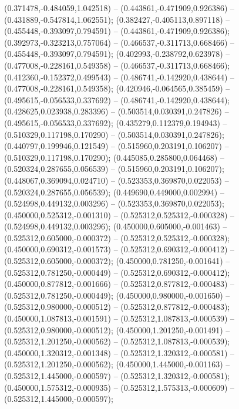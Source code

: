  (0.371478,-0.484059,1.042518) -- (0.443861,-0.471909,0.926386) -- (0.431889,-0.547814,1.062551);
 (0.382427,-0.405113,0.897118) -- (0.455448,-0.393097,0.794591) -- (0.443861,-0.471909,0.926386);
 (0.392973,-0.323213,0.757064) -- (0.466537,-0.311713,0.668466) -- (0.455448,-0.393097,0.794591);
 (0.402993,-0.238792,0.623978) -- (0.477008,-0.228161,0.549358) -- (0.466537,-0.311713,0.668466);
 (0.412360,-0.152372,0.499543) -- (0.486741,-0.142920,0.438644) -- (0.477008,-0.228161,0.549358);
 (0.420946,-0.064565,0.385459) -- (0.495615,-0.056533,0.337692) -- (0.486741,-0.142920,0.438644);
 (0.428625,0.023938,0.283396) -- (0.503514,0.030391,0.247826) -- (0.495615,-0.056533,0.337692);
 (0.435279,0.112379,0.194943) -- (0.510329,0.117198,0.170290) -- (0.503514,0.030391,0.247826);
 (0.440797,0.199946,0.121549) -- (0.515960,0.203191,0.106207) -- (0.510329,0.117198,0.170290);
 (0.445085,0.285800,0.064468) -- (0.520324,0.287655,0.056539) -- (0.515960,0.203191,0.106207);
 (0.448067,0.369094,0.024710) -- (0.523353,0.369870,0.022053) -- (0.520324,0.287655,0.056539);
 (0.449690,0.449000,0.002994) -- (0.524998,0.449132,0.003296) -- (0.523353,0.369870,0.022053);
 (0.450000,0.525312,-0.001310) -- (0.525312,0.525312,-0.000328) -- (0.524998,0.449132,0.003296);
 (0.450000,0.605000,-0.001463) -- (0.525312,0.605000,-0.000372) -- (0.525312,0.525312,-0.000328);
 (0.450000,0.690312,-0.001573) -- (0.525312,0.690312,-0.000412) -- (0.525312,0.605000,-0.000372);
 (0.450000,0.781250,-0.001641) -- (0.525312,0.781250,-0.000449) -- (0.525312,0.690312,-0.000412);
 (0.450000,0.877812,-0.001666) -- (0.525312,0.877812,-0.000483) -- (0.525312,0.781250,-0.000449);
 (0.450000,0.980000,-0.001650) -- (0.525312,0.980000,-0.000512) -- (0.525312,0.877812,-0.000483);
 (0.450000,1.087813,-0.001591) -- (0.525312,1.087813,-0.000539) -- (0.525312,0.980000,-0.000512);
 (0.450000,1.201250,-0.001491) -- (0.525312,1.201250,-0.000562) -- (0.525312,1.087813,-0.000539);
 (0.450000,1.320312,-0.001348) -- (0.525312,1.320312,-0.000581) -- (0.525312,1.201250,-0.000562);
 (0.450000,1.445000,-0.001163) -- (0.525312,1.445000,-0.000597) -- (0.525312,1.320312,-0.000581);
 (0.450000,1.575312,-0.000935) -- (0.525312,1.575313,-0.000609) -- (0.525312,1.445000,-0.000597);
